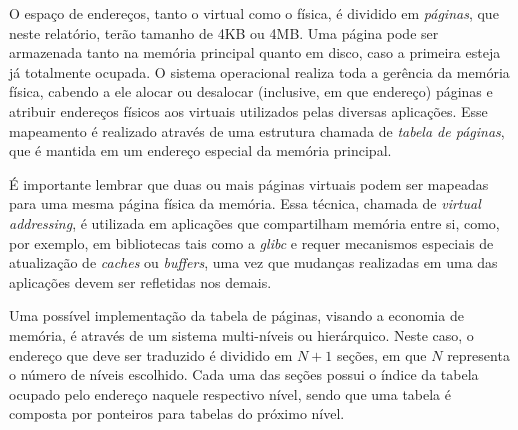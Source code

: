 \documentclass[12pt]{article}
\begin{document}
O espaço de endereços, tanto o virtual como o física, é dividido em
\textit{páginas}, que neste relatório, terão tamanho de 4KB ou 4MB. Uma página
pode ser armazenada tanto na memória principal quanto em disco, caso a primeira
esteja já totalmente ocupada. O sistema operacional realiza toda a gerência da
memória física, cabendo a ele alocar ou desalocar (inclusive, em que endereço)
páginas e atribuir endereços físicos aos virtuais utilizados pelas diversas
aplicações. Esse mapeamento é realizado através de uma estrutura chamada de
\textit{tabela de páginas}, que é mantida em um endereço especial da memória
principal.

É importante lembrar que duas ou mais páginas virtuais podem ser mapeadas para
uma mesma página física da memória. Essa técnica, chamada de \textit{virtual
addressing}, é utilizada em aplicações que compartilham memória entre si, como,
por exemplo, em bibliotecas tais como a \textit{glibc} e requer mecanismos
especiais de atualização de \textit{caches} ou \textit{buffers}, uma vez que
mudanças realizadas em uma das aplicações devem ser refletidas nos demais.

Uma possível implementação da tabela de páginas, visando a economia de memória,
é através de um sistema multi-níveis ou hierárquico. Neste caso, o endereço que 
deve ser traduzido é dividido em \(N+1\) seções, em que \(N\) representa o
número de níveis escolhido. Cada uma das seções possui o índice da tabela
ocupado pelo endereço naquele respectivo nível, sendo que uma tabela é composta
por ponteiros para tabelas do próximo nível.
\end{document}
